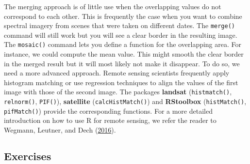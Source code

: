 \documentclass[]{krantz}
\begin{document}
The merging approach is of little use when the overlapping values do not correspond to each other.
This is frequently the case when you want to combine spectral imagery from scenes that were taken on different dates.
The \texttt{merge()} command will still work but you will see a clear border in the resulting image.
The \texttt{mosaic()} command lets you define a function for the overlapping area.
For instance, we could compute the mean value.
This might smooth the clear border in the merged result but it will most likely not make it disappear.
To do so, we need a more advanced approach.
Remote sensing scientists frequently apply histogram matching or use regression techniques to align the values of the first image with those of the second image.
The packages \textbf{landsat} (\texttt{histmatch()}, \texttt{relnorm()}, \texttt{PIF()}), \textbf{satellite} (\texttt{calcHistMatch()}) and \textbf{RStoolbox} (\texttt{histMatch()}, \texttt{pifMatch()}) provide the corresponding functions.
For a more detailed introduction on how to use R for remote sensing, we refer the reader to Wegmann, Leutner, and Dech (\protect\hyperlink{ref-wegmann_remote_2016}{2016}).

\hypertarget{exercises-2}{%
\subsection{Exercises}\label{exercises-2}}
\end{document}
